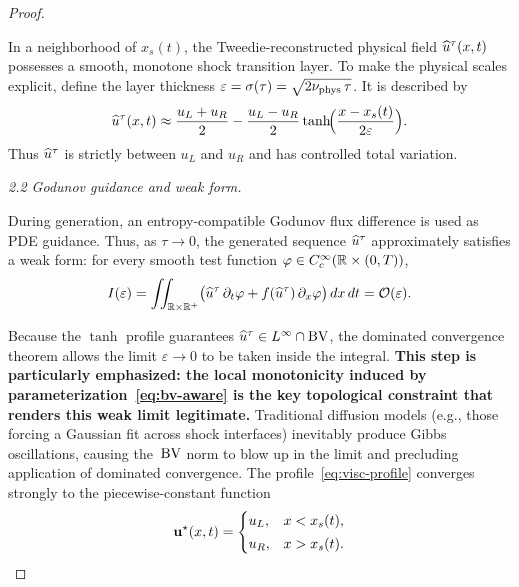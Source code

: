 \begin{proof}
\begin{lemma}
\label{lem:visc-profile}
In a neighborhood of $x_{s}(t)$, the Tweedie-reconstructed physical field
$\widehat{u}^{\tau}(x,t)$ possesses a smooth, monotone shock transition layer.
To make the physical scales explicit, define the layer thickness
$\varepsilon = \sigma(\tau) = \sqrt{2\nu_{\mathrm{phys}}\,\tau}$.
It is described by
\begin{equation}
\label{eq:visc-profile}
\widehat{u}^{\tau}(x,t)
  \approx \frac{u_{L}+u_{R}}{2}
        - \frac{u_{L}-u_{R}}{2}
          \tanh\!\Bigl( \frac{x - x_{s}(t)}{2\varepsilon} \Bigr).
\end{equation}
Thus $\widehat{u}^{\tau}$ is strictly between $u_{L}$ and $u_{R}$ and has controlled total variation.
\end{lemma}

\smallskip
\noindent\textit{2.2  Godunov guidance and weak form.}

During generation, an entropy-compatible Godunov flux difference is used as PDE guidance.
Thus, as $\tau\to0$, the generated sequence $\widehat{u}^{\tau}$ approximately satisfies a weak form:
for every smooth test function $\varphi \in C_{c}^{\infty}(\mathbb{R}\times(0,T))$,
\begin{equation}
\label{eq:weak-form}
I(\varepsilon)
  = \iint_{\mathbb{R}\times\mathbb{R}^{+}}
    \bigl( \widehat{u}^{\tau}\,\partial_{t}\varphi + f(\widehat{u}^{\tau})\,\partial_{x}\varphi \bigr)
    \,dx\,dt
  = \mathcal{O}(\varepsilon).
\end{equation}

Because the $\tanh$ profile guarantees $\widehat{u}^{\tau} \in L^{\infty} \cap \mathrm{BV}$, the dominated
convergence theorem allows the limit $\varepsilon\to0$ to be taken inside the integral.
\textbf{This step is particularly emphasized: the local monotonicity induced by
parameterization~\eqref{eq:bv-aware} is the key topological constraint that renders this weak
limit legitimate.}
Traditional diffusion models (e.g., those forcing a Gaussian fit across shock interfaces)
inevitably produce Gibbs oscillations, causing the~$\mathrm{BV}$ norm to blow up in the limit and
precluding application of dominated convergence.
The profile~\eqref{eq:visc-profile} converges strongly to the piecewise-constant function
\begin{equation}
\mathbf{u}^{\star}(x,t) =
\begin{cases}
u_{L}, & x < x_{s}(t),\\[2pt]
u_{R}, & x > x_{s}(t).
\end{cases}
\end{equation}


\end{proof}
